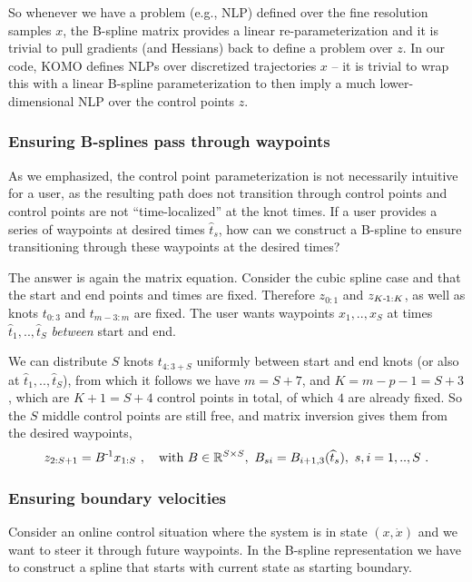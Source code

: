 So whenever we have a problem (e.g., NLP) defined over the fine
resolution samples $x$, the B-spline matrix provides a linear
re-parameterization and it is trivial to pull gradients (and Hessians)
back to define a problem over $z$. In our code, KOMO defines NLPs over
discretized trajectories $x$ -- it is trivial to wrap this with a
linear B-spline parameterization to then imply a much
lower-dimensional NLP over the control points $z$.

\subsubsection{Ensuring B-splines pass through waypoints}

As we emphasized, the control point parameterization is not
necessarily intuitive for a user, as the resulting path does not
transition through control points and control points are not
``time-localized'' at the knot times. If a user provides a series of
waypoints at desired times $\hat t_s$, how can we construct a B-spline
to ensure transitioning through these waypoints at the desired times?

The answer is again the matrix equation. Consider the cubic spline
case and that the start and end points and times are fixed. Therefore
$z_{0:1}$ and $z_{K{{\hspace*{-.0pt}\text{\rm -}\hspace*{-.5pt}}1}:K}$, as well as knots $t_{0:3}$ and $t_{m-3:m}$
are fixed. The user wants waypoints $x_1,..,x_S$ at times $\hat
t_1,..,\hat t_S$ \emph{between} start and end.

We can distribute $S$ knots $t_{4:3+S}$ uniformly between start and end knots (or also at $\hat t_1,..,\hat t_S$), from which it follows we have $m = S+7$, and $K=m-p-1=S+3$, which are $K+1=S+4$ control points in total, of which $4$ are already fixed. So the $S$ middle control points are still free, and matrix inversion gives them from the desired waypoints,
\begin{align}
  z_{2:S+1} = B^{{\hspace*{-.0pt}\text{\rm -}\hspace*{-.5pt}}1} x_{1:S} ~,\quad \text{with } B \in {\mathbb{R}}^{S \times S},~ B_{si} =  B_{i+1,3}(\widehat t_s),~ s,i=1,..,S  ~.
\end{align}

\subsubsection{Ensuring boundary velocities}

Consider an online control situation where the system is in
state $(x,\dot x)$ and we want to steer it through future
waypoints. In the B-spline representation we have to construct a
spline that starts with current state as starting boundary.

